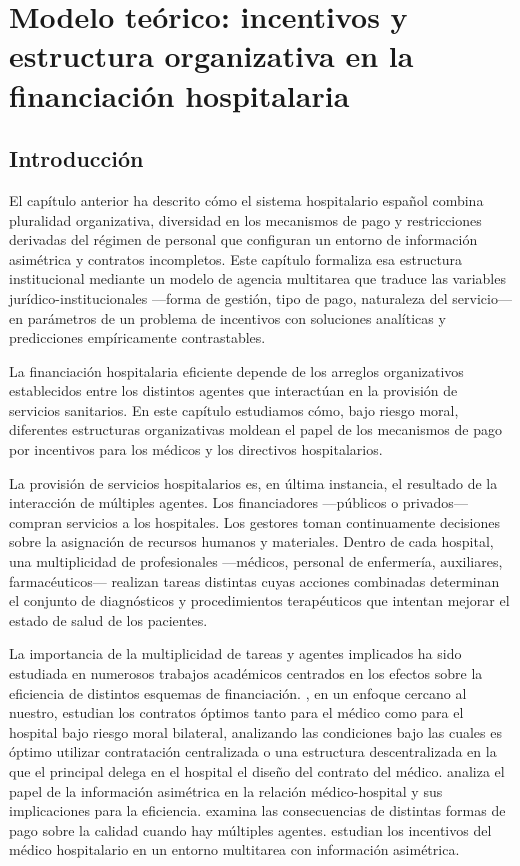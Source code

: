 ﻿\chapter{Modelo teórico: incentivos y estructura organizativa en la financiación hospitalaria}
\label{ch:modelo}

\section{Introducción}

El capítulo anterior ha descrito cómo el sistema hospitalario español combina pluralidad organizativa, diversidad en los mecanismos de pago y restricciones derivadas del régimen de personal que configuran un entorno de información asimétrica y contratos incompletos. Este capítulo formaliza esa estructura institucional mediante un modelo de agencia multitarea que traduce las variables jurídico-institucionales ---forma de gestión, tipo de pago, naturaleza del servicio--- en parámetros de un problema de incentivos con soluciones analíticas y predicciones empíricamente contrastables.

La financiación hospitalaria eficiente depende de los arreglos organizativos establecidos entre los distintos agentes que interactúan en la provisión de servicios sanitarios. En este capítulo estudiamos cómo, bajo riesgo moral, diferentes estructuras organizativas moldean el papel de los mecanismos de pago por incentivos para los médicos y los directivos hospitalarios.

La provisión de servicios hospitalarios es, en última instancia, el resultado de la interacción de múltiples agentes. Los financiadores ---públicos o privados--- compran servicios a los hospitales. Los gestores toman continuamente decisiones sobre la asignación de recursos humanos y materiales. Dentro de cada hospital, una multiplicidad de profesionales ---médicos, personal de enfermería, auxiliares, farmacéuticos--- realizan tareas distintas cuyas acciones combinadas determinan el conjunto de diagnósticos y procedimientos terapéuticos que intentan mejorar el estado de salud de los pacientes.

La importancia de la multiplicidad de tareas y agentes implicados ha sido estudiada en numerosos trabajos académicos centrados en los efectos sobre la eficiencia de distintos esquemas de financiación. \citet{jelovac2002}, en un enfoque cercano al nuestro, estudian los contratos óptimos tanto para el médico como para el hospital bajo riesgo moral bilateral, analizando las condiciones bajo las cuales es óptimo utilizar contratación centralizada o una estructura descentralizada en la que el principal delega en el hospital el diseño del contrato del médico. \citet{ma1997} analiza el papel de la información asimétrica en la relación médico-hospital y sus implicaciones para la eficiencia. \citet{eggleston2005} examina las consecuencias de distintas formas de pago sobre la calidad cuando hay múltiples agentes. \citet{kaarboe2011} estudian los incentivos del médico hospitalario en un entorno multitarea con información asimétrica.

